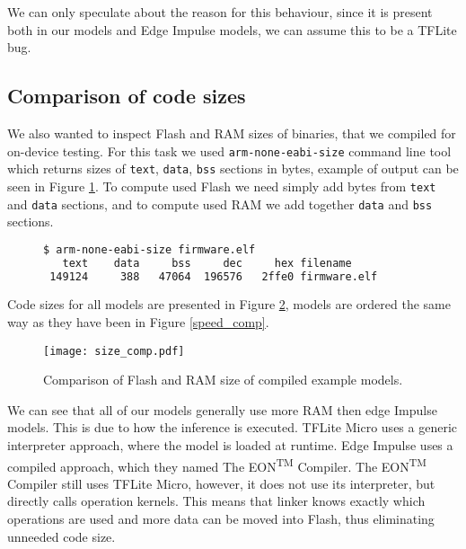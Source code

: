 We can only speculate about the reason for this behaviour, since it is present both in our models and Edge Impulse models, we can assume this to be a TFLite bug.

\subsection{ Comparison of code sizes}

We also wanted to inspect Flash and RAM sizes of binaries, that we compiled for on-device testing.
For this task we used \verb|arm-none-eabi-size| command line tool which returns sizes of \verb|text|, \verb|data|, \verb|bss| sections in bytes, example of output can be seen in Figure \ref{size_output}.
To compute used Flash we need simply add bytes from \verb|text| and \verb|data| sections, and to compute used RAM we add together \verb|data| and \verb|bss| sections\footnotemark.
\lstset{style=mystyle}
\begin{figure}[ht] 
\begin{lstlisting}[language=bash]
$ arm-none-eabi-size firmware.elf
   text	   data	    bss	    dec	    hex	filename
 149124	    388	  47064	 196576	  2ffe0	firmware.elf
\end{lstlisting}
\label{size_output}
\end{figure}
Code sizes for all models are presented in Figure \ref{size_comp}, models are ordered the same way as they have been in Figure \ref{speed_comp}.
\begin{figure}[ht]
    \centering
    \texttt{[image: size\_comp.pdf]}
    \caption{ Comparison of Flash and RAM size of compiled example models.}
    \label{size_comp}
\end{figure}

We can see that all of our models generally use more RAM then edge Impulse models.
This is due to how the inference is executed.
TFLite Micro uses a generic interpreter approach, where the model is loaded at runtime.
Edge Impulse uses a compiled approach, which they named The EON\textsuperscript{TM} Compiler\cite{eon}.
The EON\textsuperscript{TM} Compiler still uses TFLite Micro, however, it does not use its interpreter, but directly calls operation kernels.
This means that linker knows exactly which operations are used and more data can be moved into Flash, thus eliminating unneeded code size\cite{eon}.



